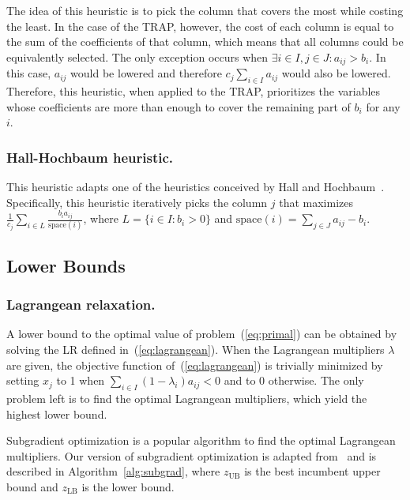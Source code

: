 \documentclass[runningheads]{llncs}
\begin{document}
The idea of this heuristic is to pick the column that covers the most while costing the least. In the case of the TRAP, however, the cost of each column is equal to the sum of the coefficients of that column, which means that all columns could be equivalently selected. The only exception occurs when $\exists i \in I, j \in J : a_{ij} > b_i$. In this case, $a_{ij}$ would be lowered and therefore $c_j \sum_{i \in I} a_{ij}$ would also be lowered. Therefore, this heuristic, when applied to the TRAP, prioritizes the variables whose coefficients are more than enough to cover the remaining part of $b_i$ for any $i$. 

\subsubsection{Hall-Hochbaum heuristic.} This heuristic adapts one of the heuristics conceived by Hall and Hochbaum~\cite{hall-hochbaum-1992-multicovering}. Specifically, this heuristic iteratively picks the column $j$ that maximizes $\frac{1}{c_j} \sum_{i \in L} \frac{b_i a_{ij}}{\text{space}(i)}$, where $L = \{i \in I : b_i > 0 \}$ and $\text{space}(i) = \sum_{j \in J} a_{ij} - b_i$.

\subsection{Lower Bounds}
\label{subsec:branch-bound:lb}

\subsubsection{Lagrangean relaxation.} A lower bound to the optimal value of problem~(\ref{eq:primal}) can be obtained by solving the LR defined in~(\ref{eq:lagrangean}). When the Lagrangean multipliers $\lambda$ are given, the objective function of~(\ref{eq:lagrangean}) is trivially minimized by setting $x_j$ to 1 when $\sum_{i \in I} (1 - \lambda_i) a_{ij} < 0$ and to 0 otherwise. The only problem left is to find the optimal Lagrangean multipliers, which yield the highest lower bound.

Subgradient optimization is a popular algorithm to find the optimal Lagrangean multipliers. Our version of subgradient optimization is adapted from~\cite{balas-carrera-1996-dynamic} and is described in Algorithm~\ref{alg:subgrad}, where $z_{\text{UB}}$ is the best incumbent upper bound and $z_{\text{LB}}$ is the lower bound.
\end{document}
